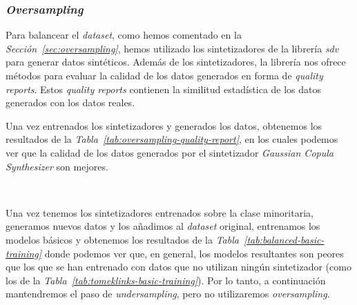 \clearpage
\subsubsection{\textit{Oversampling}}

Para balancear el \textit{dataset}, como hemos comentado en la \textit{Sección\ \ref{sec:oversampling}}, hemos utilizado los sintetizadores de la librería \textit{sdv} para generar datos sintéticos. Además de los sintetizadores, la librería nos ofrece métodos para evaluar la calidad de los datos generados en forma de \textit{quality reports}. Estos \textit{quality reports} contienen la similitud estadística de los datos generados con los datos reales.

Una vez entrenados los sintetizadores y generados los datos, obtenemos los resultados de la \textit{Tabla\ \ref{tab:oversampling-quality-report}}, en los cuales podemos ver que la calidad de los datos generados por el sintetizador \textit{Gaussian Copula Synthesizer} son mejores.

\begin{table}[!h]
    \centering
    \caption{Resultados del \textit{quality report} de los datos generados con los sintetizadores. Fuente propia}\ \label{tab:oversampling-quality-report}
\end{table}

Una vez tenemos los sintetizadores entrenados sobre la clase minoritaria, generamos nuevos datos y los añadimos al \textit{dataset} original, entrenamos los modelos básicos y obtenemos los resultados de la \textit{Tabla\ \ref{tab:balanced-basic-training}} donde podemos ver que, en general, los modelos resultantes son peores que los que se han entrenado con datos que no utilizan ningún sintetizador (como los de la \textit{Tabla\ \ref{tab:tomeklinks-basic-training}}). Por lo tanto, a continuación mantendremos el paso de \textit{undersampling}, pero no utilizaremos \textit{oversampling}.

